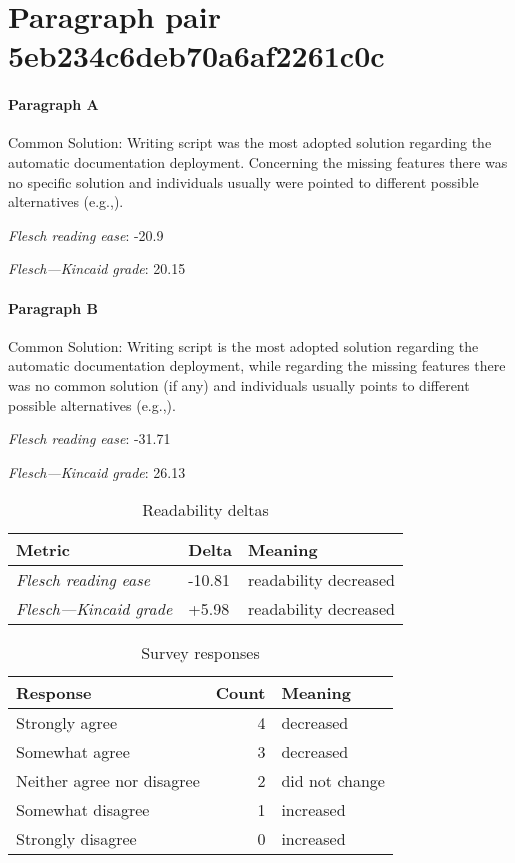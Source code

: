 \newpage
\section{Paragraph pair 5eb234c6deb70a6af2261c0c}
\paragraph{Paragraph A}
Common Solution: Writing script was the most adopted solution regarding the automatic documentation deployment. Concerning the missing features there was no specific solution and individuals usually were pointed to different possible alternatives (e.g.,).\par\medskip
\emph{Flesch reading ease}: -20.9\par
\emph{Flesch---Kincaid grade}: 20.15

\paragraph{Paragraph B}
Common Solution: Writing script is the most adopted solution regarding the automatic documentation deployment, while regarding the missing features there was no common solution (if any) and individuals usually points to different possible alternatives (e.g.,).\par\medskip
\emph{Flesch reading ease}: -31.71\par
\emph{Flesch---Kincaid grade}: 26.13

\bigskip\begin{table}[!h]
\centering
\begin{tabular}{lll}
\toprule
               \textbf{Metric} & \textbf{Delta} &       \textbf{Meaning} \\
\midrule
    \emph{Flesch reading ease} &         -10.81 &  readability decreased \\
 \emph{Flesch---Kincaid grade} &          +5.98 &  readability decreased \\
\bottomrule
\end{tabular}
\caption*{Readability deltas}\end{table}

\begin{table}[!h]
\centering
\begin{tabular}{lrl}
\toprule
          \textbf{Response} &  \textbf{Count} & \textbf{Meaning} \\
\midrule
             Strongly agree &               4 &        decreased \\
             Somewhat agree &               3 &        decreased \\
 Neither agree nor disagree &               2 &   did not change \\
          Somewhat disagree &               1 &        increased \\
          Strongly disagree &               0 &        increased \\
\bottomrule
\end{tabular}
\caption*{Survey responses}\end{table}

